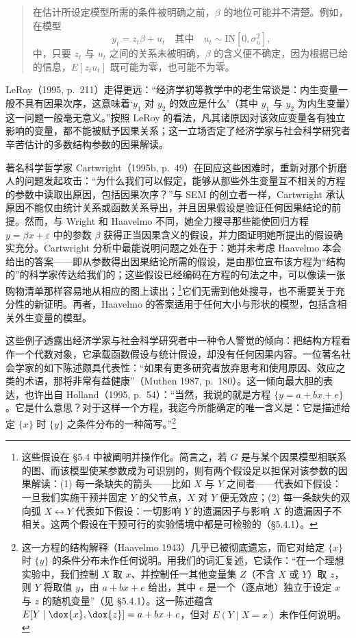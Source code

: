 \begin{quote}
\kaishu
在估计所设定模型所需的条件被明确之前，$\beta$ 的地位可能并不清楚。例如，在模型
\[
y_t=z_t\beta+u_t\quad\text{其中}\quad u_t\sim \mathrm{IN}[0,\sigma_u^2],
\]
中，只要 $z_t$ 与 $u_t$ 之间的关系未被明确，$\beta$ 的含义便不确定，因为根据已给的信息，$E[z_tu_t]$ 既可能为零，也可能不为零。
\end{quote}

LeRoy（1995, p.~211）走得更远：“经济学初等教学中的老生常谈是：内生变量一般不具有因果次序，这意味着‘$y_1$ 对 $y_2$ 的效应是什么’（其中 $y_1$ 与 $y_2$ 为内生变量）这一问题一般毫无意义。”按照 LeRoy 的看法，凡其诸原因对该效应变量各有独立影响的变量，都不能被赋予因果关系；这一立场否定了经济学家与社会科学研究者辛苦估计的多数结构参数的因果解读。

著名科学哲学家 Cartwright（1995b, p.~49）在回应这些困难时，重新对那个折磨人的问题发起攻击：“为什么我们可以假定，能够从那些外生变量互不相关的方程的参数中读取出原因，包括因果次序？”与 SEM 的创立者一样，Cartwright 承认原因不能仅由统计关系或函数关系导出，并且因果假设是验证任何因果结论的前提。然而，与 Wright 和 Haavelmo 不同，她全力搜寻那些能使回归方程 $y=\beta x+\varepsilon$ 中的参数 $\beta$ 获得正当因果含义的假设，并力图证明她所提出的假设确实充分。Cartwright 分析中最能说明问题之处在于：她并未考虑 Haavelmo 本会给出的答案——即从参数得出因果结论所需的假设，是由那位宣布该方程为“结构的”的科学家传达给我们的；这些假设已经编码在方程的句法之中，可以像读一张购物清单那样容易地从相应的图上读出；\footnote{这些假设在 \S 5.4 中被阐明并操作化。简言之，若 $G$ 是与某个因果模型相联系的图、而该模型使某参数成为可识别的，则有两个假设足以担保对该参数的因果解读：(1) 每一条缺失的箭头——比如 $X$ 与 $Y$ 之间者——代表如下假设：一旦我们实施干预并固定 $Y$ 的父节点，$X$ 对 $Y$ 便无效应；(2) 每一条缺失的双向弧 $X\longleftrightarrow Y$ 代表如下假设：一切影响 $Y$ 的遗漏因子与影响 $X$ 的遗漏因子不相关。这两个假设在干预可行的实验情境中都是可检验的（\S 5.4.1）。}它们无需到他处搜寻，也不需要关于充分性的新证明。再者，Haavelmo 的答案适用于任何大小与形状的模型，包括含相关外生变量的模型。

这些例子透露出经济学家与社会科学研究者中一种令人警觉的倾向：把结构方程看作一个代数对象，它承载函数假设与统计假设，却没有任何因果内容。一位著名社会学家的如下陈述颇具代表性：“如果有更多研究者放弃思考和使用原因、效应之类的术语，那将非常有益健康”（Muthen 1987, p.~180）。这一倾向最大胆的表达，也许出自 Holland（1995, p.~54）：“当然，我说的就是方程 $\{y=a+bx+e\}$。它是什么意思？对于这样一个方程，我迄今所能确定的唯一含义是：它是描述给定 $\{x\}$ 时 $\{y\}$ 之条件分布的一种简写。”\footnote{这一方程的结构解释（Haavelmo 1943）几乎已被彻底遗忘，而它对给定 $\{x\}$ 时 $\{y\}$ 的条件分布未作任何说明。用我们的词汇复述，它读作：“在一个理想实验中，我们控制 $X$ 取 $x$、并控制任一其他变量集 $Z$（不含 $X$ 或 $Y$）取 $z$，则 $Y$ 将取值 $y$，由 $a+bx+e$ 给出，其中 $e$ 是一个（逐点地）独立于设定 $x$ 与 $z$ 的随机变量”（见 \S 5.4.1）。这一陈述蕴含 $E[Y\mid \dox{x},\dox{z}]=a+bx+c$，但对 $E(Y\mid X=x)$ 未作任何说明。}


